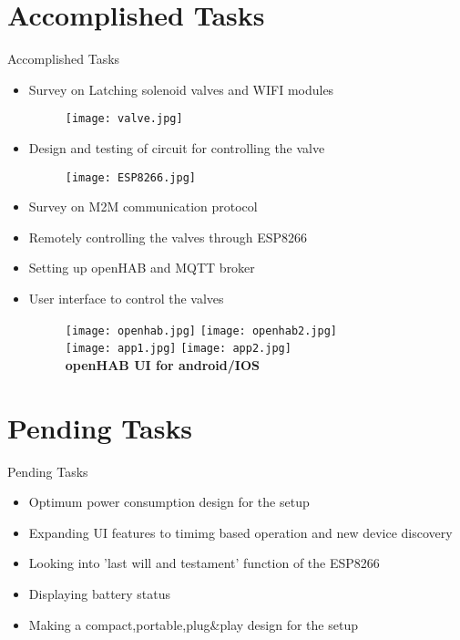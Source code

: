 \documentclass[10pt, a4paper]{beamer}
\begin{document}
\section{Accomplished Tasks}
\begin{frame}{Accomplished Tasks}
        
	\begin{itemize}
		\item Survey on Latching solenoid valves and WIFI modules
		\begin{figure}
		 \texttt{[image: valve.jpg]}
		\end{figure}
		\item Design and testing of circuit for controlling the valve
		\begin{figure}
		 \texttt{[image: ESP8266.jpg]}
		\end{figure}
		\item Survey on M2M communication protocol
		\item Remotely controlling the valves through ESP8266 
		\item Setting up openHAB and MQTT broker
		\item User interface to control the valves
		\begin{figure}
		 \texttt{[image: openhab.jpg]} \hspace{1cm}
		 \texttt{[image: openhab2.jpg]} \\ 
		  \texttt{[image: app1.jpg]} \hspace{1cm}
		 \texttt{[image: app2.jpg]}\\
		 {\bf openHAB UI for android/IOS}
		\end{figure}
	\end{itemize}	
 
\end{frame}

\section{Pending Tasks}
\begin{frame}{Pending Tasks}
        \begin{itemize}
		\item Optimum power consumption design for the setup   
		\item Expanding UI features to timimg based operation and new device discovery
		\item Looking into 'last will and testament' function of the ESP8266
		\item Displaying battery status
		\item Making a compact,portable,plug\&play design for the setup 		
	\end{itemize}	
\end{frame}
\end{document}
